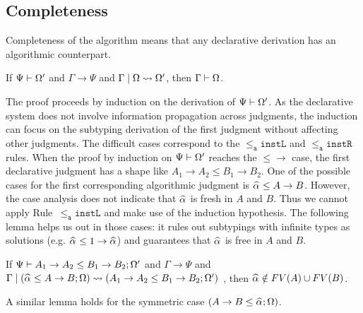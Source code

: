 
\subsection{Completeness}

Completeness of the algorithm means that any declarative derivation has an
algorithmic counterpart. 
\begin{theorem}[Completeness]
	If $\Psi\vdash \Omega'$ and $\Gamma \to \Psi$ and $\Gamma \mid \Omega\rightsquigarrow \Omega'$, then $\Gamma\vdash \Omega$.
\end{theorem}

The proof proceeds by induction on the derivation of $\Psi\vdash\Omega'$. As the
declarative system does not involve information propagation across judgments,
the induction can focus on the subtyping derivation of the first judgment
without affecting other judgments.
The difficult cases correspond to the $\mathtt{{\le_a}instL}$ and
$\mathtt{{\le_a}instR}$ rules.  When the proof by induction on $\Psi\vdash
\Omega'$ reaches the $\mathtt{{\le}{\to}}$ case, the first declarative
judgment has a shape like $A_1\to A_2 \le B_1\to B_2$. 
One of the possible cases for the first corresponding algorithmic judgment
is $\al\le A\to B$. However, the case analysis does not indicate
that $\al$ is fresh in $A$ and $B$. Thus we cannot apply
Rule~$\mathtt{{\le_a}instL}$ and make use of the induction hypothesis.
The following lemma helps us out in those cases:
it rules out subtypings with infinite types as solutions (e.g. $\al \le 1
\to \al$) and guarantees that $\al$ is free in $A$ and $B$.
\begin{lemma}
	If $\Psi \vdash A_1\to A_2 \le B_1\to B_2 ; \Omega'$ and $\Gamma\to \Psi$ and $\Gamma\mid (\jcons{\al \le A\to B}{\exps}) \rightsquigarrow
	(\jcons{A_1\to A_2 \le B_1\to B_2}{\exps'})$
	, then $\al \notin FV(A)\cup FV(B)$. 
\end{lemma}
A similar lemma holds for the symmetric case $(\jcons{A \to B \le \al}{\Omega})$.

